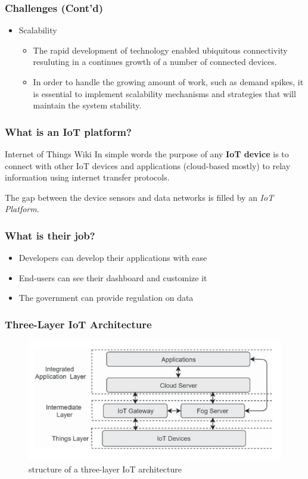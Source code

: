 \documentclass{../iot-lecture}
\begin{document}
\begin{frame}
  \frametitle{Challenges (Cont'd)}
  \begin{itemize}
    \item Scalability
    \begin{itemize}
      \item The rapid development of technology enabled ubiquitous connectivity resuluting in a continues growth of a number of connected devices.
      \item In order to handle the growing amount of work, such as demand spikes, it is essential to implement scalability mechanisms and strategies that will maintain the system stability.
    \end{itemize}
  \end{itemize}
\end{frame}

\begin{frame}
  \frametitle{What is an IoT platform?}
  \begin{block}{Internet of Things Wiki}
    In simple words the purpose of any \textbf{\color{YellowOrange} IoT device} is to connect with
    other IoT devices and applications (cloud-based mostly) to relay
    information using internet transfer protocols.

    The gap between the device sensors and data networks is filled
    by an \textit{\color{Green} IoT Platform}.
  \end{block}
\end{frame}

\begin{frame}
  \frametitle{What is their job?}
  \begin{itemize}
    \item Developers can develop their applications with ease
    \item End-users can see their dashboard and customize it
    \item The government can provide regulation on data
  \end{itemize}
\end{frame}

\begin{frame}
  \frametitle{Three-Layer IoT Architecture}
  \begin{figure}
    \centering
    \includegraphics[width=\textwidth]{./img/three-layer-iot-architecture.png}
    \caption{structure of a three-layer IoT architecture}
  \end{figure}
\end{frame}
\end{document}
